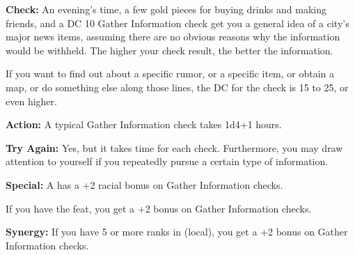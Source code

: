 
\textbf{Check:} An evening's time, a few gold pieces for buying drinks and making 
friends, and a DC 10 Gather Information check get you a general idea of a city's 
major news items, assuming there are no obvious reasons why the information would 
be withheld. The higher your check result, the better the information.

If you want to find out about a specific rumor, or a specific item, or obtain a 
map, or do something else along those lines, the DC for the check is 15 to 25, 
or even higher.

\textbf{Action:} A typical Gather Information check takes 1d4+1 hours.

\textbf{Try Again:} Yes, but it takes time for each check. Furthermore, you may 
draw attention to yourself if you repeatedly pursue a certain type of information.

\textbf{Special:} A  has a +2 racial bonus on Gather Information checks.

If you have the  feat, you get a +2 bonus on Gather Information checks.

\textbf{Synergy:} If you have 5 or more ranks in  (local), you get a +2 
bonus on Gather Information checks.
